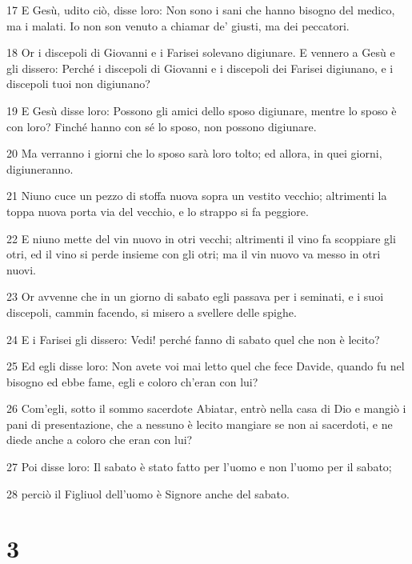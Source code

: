 \par 17 E Gesù, udito ciò, disse loro: Non sono i sani che hanno bisogno del medico, ma i malati. Io non son venuto a chiamar de' giusti, ma dei peccatori.
\par 18 Or i discepoli di Giovanni e i Farisei solevano digiunare. E vennero a Gesù e gli dissero: Perché i discepoli di Giovanni e i discepoli dei Farisei digiunano, e i discepoli tuoi non digiunano?
\par 19 E Gesù disse loro: Possono gli amici dello sposo digiunare, mentre lo sposo è con loro? Finché hanno con sé lo sposo, non possono digiunare.
\par 20 Ma verranno i giorni che lo sposo sarà loro tolto; ed allora, in quei giorni, digiuneranno.
\par 21 Niuno cuce un pezzo di stoffa nuova sopra un vestito vecchio; altrimenti la toppa nuova porta via del vecchio, e lo strappo si fa peggiore.
\par 22 E niuno mette del vin nuovo in otri vecchi; altrimenti il vino fa scoppiare gli otri, ed il vino si perde insieme con gli otri; ma il vin nuovo va messo in otri nuovi.
\par 23 Or avvenne che in un giorno di sabato egli passava per i seminati, e i suoi discepoli, cammin facendo, si misero a svellere delle spighe.
\par 24 E i Farisei gli dissero: Vedi! perché fanno di sabato quel che non è lecito?
\par 25 Ed egli disse loro: Non avete voi mai letto quel che fece Davide, quando fu nel bisogno ed ebbe fame, egli e coloro ch'eran con lui?
\par 26 Com'egli, sotto il sommo sacerdote Abiatar, entrò nella casa di Dio e mangiò i pani di presentazione, che a nessuno è lecito mangiare se non ai sacerdoti, e ne diede anche a coloro che eran con lui?
\par 27 Poi disse loro: Il sabato è stato fatto per l'uomo e non l'uomo per il sabato;
\par 28 perciò il Figliuol dell'uomo è Signore anche del sabato.

\chapter{3}


